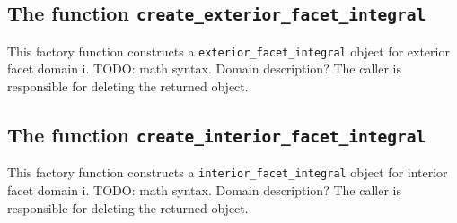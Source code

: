 \subsection{The function \texttt{create\_exterior\_facet\_integral}}
This factory function constructs a \texttt{exterior\_facet\_integral} object for exterior facet domain i.
TODO: math syntax. Domain description?
The caller is responsible for deleting the returned object.



\subsection{The function \texttt{create\_interior\_facet\_integral}}
This factory function constructs a \texttt{interior\_facet\_integral} object for interior facet domain i.
TODO: math syntax. Domain description?
The caller is responsible for deleting the returned object.





